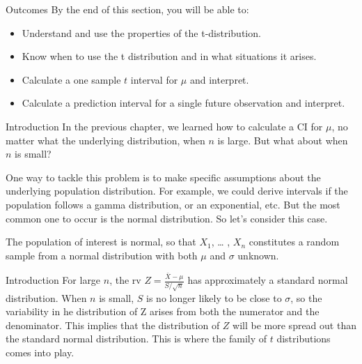\documentclass[
  ignorenonframetext,
]{beamer}
\providecommand{\tightlist}{%
  \setlength{\itemsep}{0pt}\setlength{\parskip}{0pt}}\usepackage{longtable,booktabs,array}
\begin{document}
\begin{frame}{Outcomes}
\protect\hypertarget{outcomes-2}{}
By the end of this section, you will be able to:

\begin{itemize}[<+->]
\tightlist
\item
  Understand and use the properties of the t-distribution.
\item
  Know when to use the t distribution and in what situations it arises.
\item
  Calculate a one sample \(t\) interval for \(\mu\) and interpret.
\item
  Calculate a prediction interval for a single future observation and
  interpret.
\end{itemize}
\end{frame}

\begin{frame}{Introduction}
\protect\hypertarget{introduction-4}{}
In the previous chapter, we learned how to calculate a CI for \(\mu\),
no matter what the underlying distribution, when \(n\) is large. But
what about when \(n\) is small?

One way to tackle this problem is to make specific assumptions about the
underlying population distribution. For example, we could derive
intervals if the population follows a gamma distribution, or an
exponential, etc. But the most common one to occur is the normal
distribution. So let's consider this case.

\begin{tcolorbox}[enhanced jigsaw, titlerule=0mm, colbacktitle=quarto-callout-important-color!10!white, opacityback=0, bottomrule=.15mm, colback=white, colframe=quarto-callout-important-color-frame, arc=.35mm, title=\textcolor{quarto-callout-important-color}{\faExclamation}\hspace{0.5em}{Assumption}, toprule=.15mm, breakable, coltitle=black, leftrule=.75mm, bottomtitle=1mm, left=2mm, rightrule=.15mm, toptitle=1mm, opacitybacktitle=0.6]

The population of interest is normal, so that \(X_{1}\), \ldots{} ,
\(X_{n}\) constitutes a random sample from a normal distribution with
both \(\mu\) and \(\sigma\) unknown.

\end{tcolorbox}
\end{frame}

\begin{frame}{Introduction}
\protect\hypertarget{introduction-5}{}
For large \(n\), the rv \(Z = \frac{\bar{X} - \mu}{S / \sqrt{n}}\) has
approximately a standard normal distribution. When \(n\) is small, \(S\)
is no longer likely to be close to \(\sigma\), so the variability in he
distribution of Z arises from both the numerator and the denominator.
This implies that the distribution of \(Z\) will be more spread out than
the standard normal distribution. This is where the family of \(t\)
distributions comes into play.
\end{frame}
\end{document}
